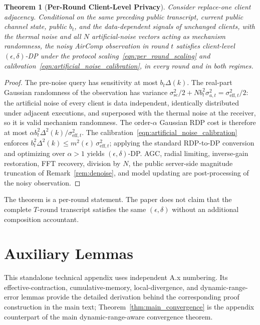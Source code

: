 \documentclass[journal]{IEEEtran}
\newcommand{\rev}[1]{{\color{revisionred}#1}}
\newtheorem{theorem}{Theorem}
\begin{document}
\begin{theorem}[\bf Per-Round Client-Level Privacy]
    \label{thm:per_round_privacy}
    Consider replace-one client adjacency. Conditional on the same preceding public transcript, current public channel state, public $b_t$, and the data-dependent signals of unchanged clients, with the thermal noise and all $N$ artificial-noise vectors acting as mechanism randomness, the noisy AirComp observation in round $t$ satisfies client-level $(\epsilon,\delta)$-DP under the protocol scaling~\eqref{eqn:per_round_scaling} and calibration~\eqref{eqn:artificial_noise_calibration}, in every round and in both regimes.
\end{theorem}
\begin{proof}
    The pre-noise query has sensitivity at most $b_t\Delta(k)$. The real-part Gaussian randomness of the observation has variance $\sigma_{\mathrm{sc}}^2/2+Nb_t^2\sigma_{a,t}^2=\sigma_{\mathrm{eff},t}^2/2$: the artificial noise of every client is data independent, identically distributed under adjacent executions, and superposed with the thermal noise at the receiver, so it is valid mechanism randomness. The order-$\alpha$ Gaussian RDP cost is therefore at most $\alpha b_t^2\Delta^2(k)/\sigma_{\mathrm{eff},t}^2$. The calibration~\eqref{eqn:artificial_noise_calibration} enforces $b_t^2\Delta^2(k)\le m^2(\epsilon)\,\sigma_{\mathrm{eff},t}^2$; applying the standard RDP-to-DP conversion and optimizing over $\alpha>1$ yields $(\epsilon,\delta)$-DP. AGC, radial limiting, inverse-gain restoration, FFT recovery, division by $N$, the public server-side magnitude truncation of Remark~\ref{rem:denoise}, and model updating are post-processing of the noisy observation.
\end{proof}

The theorem is a per-round statement. The paper does not claim that the complete $T$-round transcript satisfies the same $(\epsilon,\delta)$ without an additional composition accountant.

\section{Auxiliary Lemmas}

\rev{This standalone technical appendix uses independent A.x numbering. Its effective-contraction, cumulative-memory, local-divergence, and dynamic-range-error lemmas provide the detailed derivation behind the corresponding proof construction in the main text; Theorem~\ref{thm:main_convergence} is the appendix counterpart of the main dynamic-range-aware convergence theorem.}
\end{document}
